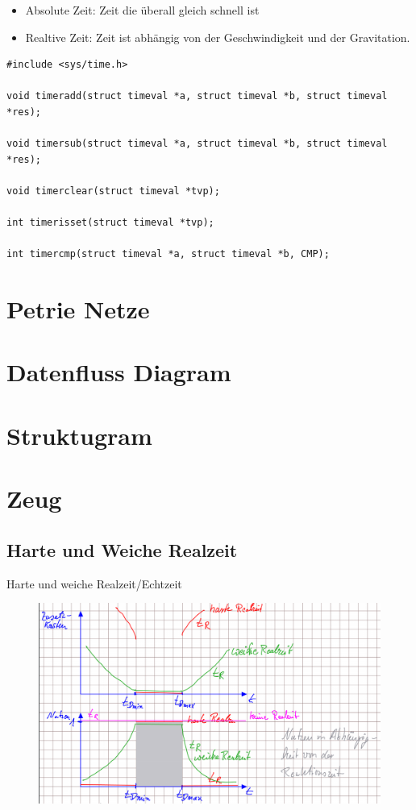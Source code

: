 \documentclass[12pt,a4paper,oneside,ngerman]{article}
\begin{document}
\begin{itemize}
	\item Absolute Zeit: Zeit die überall gleich schnell ist
	\item Realtive Zeit: Zeit ist abhängig von der Geschwindigkeit und der Gravitation.
\end{itemize}

\begin{lstlisting}
#include <sys/time.h>

void timeradd(struct timeval *a, struct timeval *b, struct timeval *res);

void timersub(struct timeval *a, struct timeval *b,	struct timeval *res);

void timerclear(struct timeval *tvp);

int timerisset(struct timeval *tvp);

int timercmp(struct timeval *a, struct timeval *b, CMP);
\end{lstlisting}


\section[Petrie Netze]{Petrie Netze}

\section[Datenfluss Diagram]{Datenfluss Diagram}

\section[Struktugram]{Struktugram}

\section[Zeug]{Zeug}
\subsection{Harte und Weiche Realzeit}
Harte und weiche Realzeit/Echtzeit\\
\begin{figure}[H]
	\centering
	\includegraphics[scale=0.3]{umlet/harte_weiche_realzeit.png}
\end{figure}
\end{document}
